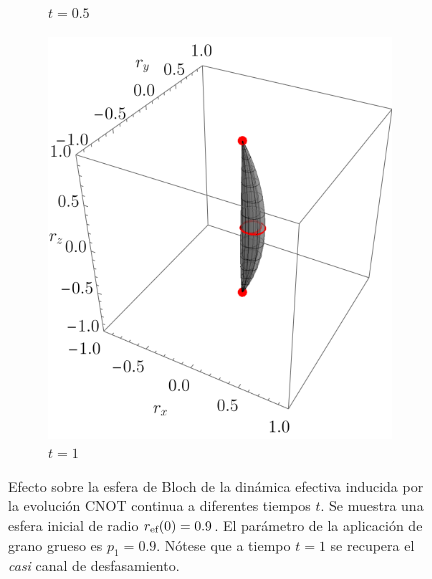\begin{figure}[ht!]
\begin{subfigure}{0.32\textwidth}
      \caption{$t=0.5$}
    \end{subfigure}
    \begin{subfigure}{0.32\textwidth}
      \centering
      \includegraphics[width=0.9\linewidth]{chapter3/figures_toy/CNOT_p=0.9_t=1._r=0.9.png}
      \caption{$t=1$}
    \end{subfigure}
    \caption{Efecto sobre la esfera de Bloch de la dinámica efectiva inducida por la evolución CNOT continua a diferentes tiempos $t$. Se muestra una esfera inicial de radio $r_{\text{ef}}(0)=0.9$. El parámetro de la aplicación de grano grueso es $p_{1}=0.9$. Nótese que a tiempo $t=1$ se recupera el \textit{casi} canal de desfasamiento.  \label{fig:AlmostPhaseFlipSequence}}
    \end{figure}

